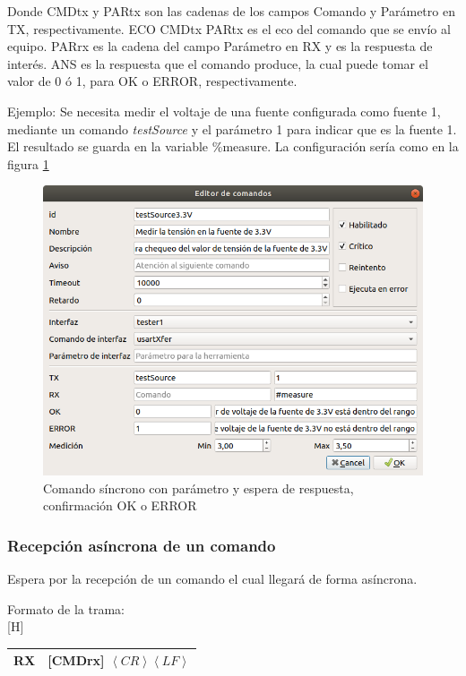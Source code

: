 \documentclass[a4paper,12pt]{refart}
\makeatletter
\renewenvironment{table}%
  {\renewcommand\familydefault\sfdefault
   \@float{table}}
  {\end@float}
\makeatother
\begin{document}
Donde CMDtx y PARtx son las cadenas de los campos Comando y Parámetro en TX, respectivamente. ECO CMDtx PARtx es el eco del comando que se envío al equipo. PARrx es la cadena del campo Parámetro en RX y es la respuesta de interés. ANS es la respuesta que el comando produce, la cual puede tomar el valor de 0 ó 1, para OK o ERROR, respectivamente.

Ejemplo: Se necesita medir el voltaje de una fuente configurada como fuente 1, mediante un comando \textit{testSource} y el parámetro 1 para indicar que es la fuente 1. El resultado se guarda en la variable \%measure. La configuración sería como en la figura \ref{fig:commands4}

\begin{figure}[H]\centering
\includegraphics[scale=0.4, frame]{images/commands4} 
\caption{Comando síncrono con parámetro y  espera de respuesta, confirmación OK o ERROR}
\label{fig:commands4}
\end{figure}

\subsubsection{Recepción asíncrona de un comando}
Espera por la recepción de un comando el cual llegará de forma asíncrona.

Formato de la trama:
\\
\begin{table}[H]
\small\centering
\begin{tabular}{|c|l|}
\hline 
RX & [CMDrx] $\left\langle CR \right\rangle \left\langle LF \right\rangle$ \\ 
\hline
\end{tabular}
\end{table}
\end{document}
